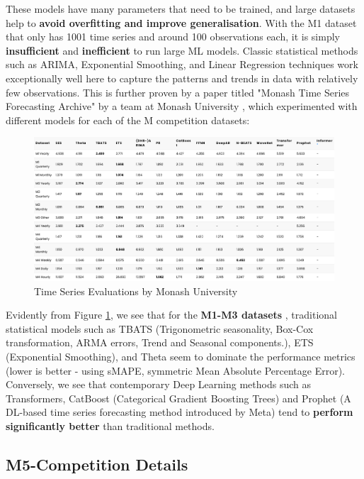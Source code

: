\documentclass[12pt]{article}
\begin{document}
\noindent These models have many parameters that need to be trained, and large datasets help to \textbf{avoid overfitting and improve generalisation}. With the M1 dataset that only has 1001 time series and around 100 observations each, it is simply \textbf{insufficient} and \textbf{inefficient} to run large ML models. Classic statistical methods such as ARIMA, Exponential Smoothing, and Linear Regression techniques work exceptionally well here to capture the patterns and trends in data with relatively few observations. This is further proven by a paper titled "Monash Time Series Forecasting Archive" by a team at Monash University \cite{godahewa2021monash}, which experimented with different models for each of the M competition datasets: 

\begin{figure}[H]
    \centering
    \includegraphics[width=\textwidth]{Images/monashtimeseries.png}
    \caption{Time Series Evaluations by Monash University}
    \label{fig:6-monash}
\end{figure} 

\noindent Evidently from Figure \ref{fig:6-monash}, we see that for the \textbf{M1-M3 datasets} \cite{godahewa2021monash}, traditional statistical models such as TBATS (Trigonometric seasonality, Box-Cox transformation, ARMA errors, Trend and Seasonal components.), ETS (Exponential Smoothing), and Theta seem to dominate the performance metrics (lower is better - using sMAPE, symmetric Mean Absolute Percentage Error). Conversely, we see that contemporary Deep Learning methods such as Transformers, CatBoost (Categorical Gradient Boosting Trees) and Prophet (A DL-based time series forecasting method introduced by Meta) tend to \textbf{perform significantly better} than traditional methods.

\subsection*{M5-Competition Details}
\end{document}
